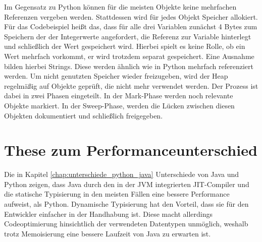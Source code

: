 Im Gegensatz zu Python können für die meisten Objekte keine mehrfachen Referenzen vergeben werden. Stattdessen wird für jedes 
Objekt Speicher allokiert. Für das Codebeispiel heißt das, dass für alle drei Variablen zunächst 4 Bytes zum Speichern der 
der Integerwerte angefordert, die Referenz zur Variable hinterlegt und schließlich der Wert gespeichert wird. Hierbei spielt 
es keine Rolle, ob ein Wert mehrfach vorkommt, er wird trotzdem separat gespeichert. Eine Ausnahme bilden hierbei Strings. 
Diese werden ähnlich wie in Python mehrfach referenziert werden. Um nicht genutzten Speicher wieder freizugeben, wird der Heap 
regelmäßig auf Objekte geprüft, die nicht mehr verwendet werden. Der Prozess ist dabei in zwei Phasen eingeteilt. In der Mark-Phase 
werden noch relevante Objekte markiert. In der Sweep-Phase, werden die Lücken zwischen diesen Objekten dokumentiert und schließlich 
freigegeben.\autocite[Vgl.][]{OracleGC.2021}

\section{These zum Performanceunterschied}

Die in Kapitel \ref{chap:unterschiede_python_java} Unterschiede von Java und Python zeigen, dass Java durch den in der JVM integrierten 
JIT-Compiler und die statische Typisierung in den meisten Fällen eine bessere Performance aufweist, als Python. 
Dynamische Typisierung hat den Vorteil, dass sie für den Entwickler einfacher in der Handhabung ist. Diese macht allerdings 
Codeoptimierung hinsichtlich der verwendeten Datentypen unmöglich, weshalb trotz Memoisierung eine bessere Laufzeit von 
Java zu erwarten ist.